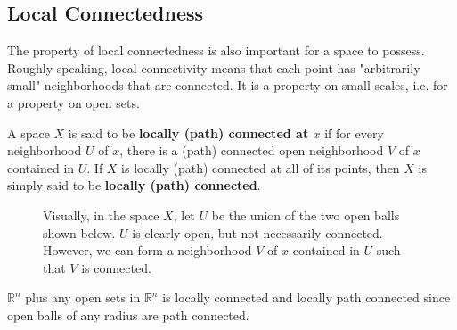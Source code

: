 \subsection{Local Connectedness}

  The property of local connectedness is also important for a space to possess. Roughly speaking, local connectivity means that each point has "arbitrarily small" neighborhoods that are connected. It is a property on small scales, i.e. for a property on open sets. 

  \begin{definition}
    A space $X$ is said to be \textbf{locally (path) connected at $x$} if for every neighborhood $U$ of $x$, there is a (path) connected open neighborhood $V$ of $x$ contained in $U$. If $X$ is locally (path) connected at all of its points, then $X$ is simply said to be \textbf{locally (path) connected}. 

    \begin{figure}[H]
      \centering 
      \caption{Visually, in the space $X$, let $U$ be the union of the two open balls shown below. $U$ is clearly open, but not necessarily connected. However, we can form a  neighborhood $V$ of $x$ contained in $U$ such that $V$ is connected. }
      \label{fig:locally_connected}
    \end{figure}
  \end{definition} 

  \begin{example}
    $\mathbb{R}^n$ plus any open sets in $\mathbb{R}^n$ is locally connected and locally path connected since open balls of any radius are path connected. 
  \end{example} 

